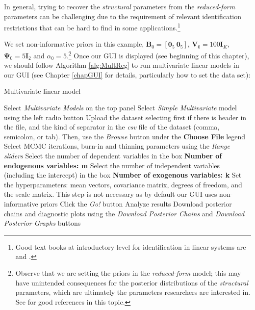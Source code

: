 In general, trying to recover the \textit{structural} parameters from the \textit{reduced-form} parameters can be challenging due to the requirement of relevant identification restrictions that can be hard to find in some applications.\footnote{Good text books at introductory level for identification in linear systems are \cite[Chap. ~19]{gujarati2009basic} and \cite[Chap. ~16]{wooldridge2016introductory}.}

We set non-informative priors in this example, $\bm{B}_0=\left[\bm{0}_5 \ \bm{0}_5\right]$, $\bm{V}_0=100\bm{I}_K$, $\bm{\Psi}_0=5\bm{I}_2$ and $\alpha_0=5$.\footnote{Observe that we are setting the priors in the \textit{reduced-form} model; this may have unintended consequences for the posterior distributions of the \textit{structural} parameters, which are ultimately the parameters researchers are interested in. See \cite[p.~302]{koop2003bayesian} for good references in this topic.} Once our GUI is displayed (see beginning of this chapter), we should follow Algorithm \ref{alg:MultReg} to run multivariate linear models in our GUI (see Chapter \ref{chapGUI} for details, particularly how to set the data set):
\begin{algorithm}[h!]
	\caption{Multivariate linear model}\label{alg:MultReg}
	\begin{algorithmic}[1]  		 			
		\State Select \textit{Multivariate Models} on the top panel
		\State Select \textit{Simple Multivariate} model using the left radio button
		\State Upload the dataset selecting first if there is header in the file, and the kind of separator in the \textit{csv} file of the dataset (comma, semicolon, or tab). Then, use the \textit{Browse} button under the \textbf{Choose File} legend
		\State Select MCMC iterations, burn-in and thinning parameters using the \textit{Range sliders}
		\State Select the number of dependent variables in the box \textbf{Number of endogenous variables: m}
		\State Select the number of independent variables (including the intercept) in the box \textbf{Number of exogenous variables: k}
		\State Set the hyperparameters: mean vectors, covariance matrix, degrees of freedom, and the scale matrix. This step is not necessary as by default our GUI uses non-informative priors
		\State Click the \textit{Go!} button
		\State Analyze results
		\State Download posterior chains and diagnostic plots using the \textit{Download Posterior Chains} and \textit{Download Posterior Graphs} buttons
	\end{algorithmic} 
\end{algorithm}

